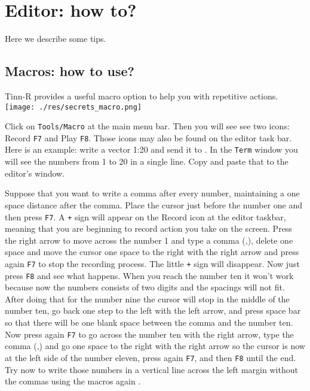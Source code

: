 
\section{Editor: how to?}

Here we describe some tips.

\subsection{Macros: how to use?}

Tinn-R provides a useful macro option to help you with repetitive actions.\\

\vspace{5mm}
\texttt{[image: ./res/secrets\_macro.png]}\\
\vspace{5mm}

Click on \texttt{Tools/Macro} at the main menu bar. Then you will see see two icons: Record \texttt{F7} and Play \texttt{F8}.
Those icons may also be found on the editor task bar. Here is an example: write a vector 1:20 and send it to \RR{}.
In the \texttt{Term} window you will see the numbers from 1 to 20 in a single line. Copy and paste that to the editor's window.

Suppose that you want to write a comma after every number, maintaining a one space distance after the comma.
Place the cursor just before the number one and then press \texttt{F7}.
A \texttt{+} sign will appear on the Record icon at the editor taskbar, meaning that you are beginning to record action
you take on the screen. Press the right arrow to move across the number 1 and type a comma (,),
delete one space and move the cursor one space to the right with the right arrow and press again
\texttt{F7} to stop the recording process. The little \texttt{+} sign will disappear.
Now just press \texttt{F8} and see what happens. When you reach the number ten it won't work because now the numbers
consists of two digits and the spacings will not fit.
After doing that for the number nine the cursor will stop in the middle of the number ten,
go back one step to the left with the left arrow, and press space bar so that there will be one blank space
between the comma and the number ten. Now press again \texttt{F7} to go across the number ten with the right arrow,
type the comma (,) and go one space to the right with the right arrow so the cursor is now at the left side of
the number eleven, press again \texttt{F7}, and then \texttt{F8} until the end.
Try now to write those numbers in a vertical line across the left margin without the commas using the macros again .

